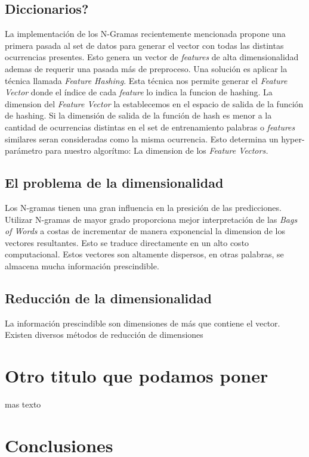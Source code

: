 \documentclass[a4paper,10pt]{article}
\begin{document}
	\subsection{Diccionarios?}
	La implementación de los N-Gramas recientemente mencionada propone una primera pasada al set de datos para generar el vector con todas las distintas ocurrencias presentes. Esto genera un vector de \textit{features} de alta dimensionalidad ademas de requerir una pasada más de preproceso. Una solución es aplicar la técnica llamada \textit{Feature Hashing}. Esta técnica nos permite generar el \textit{Feature Vector} donde el índice de cada \textit{feature} lo indica la funcion de hashing. La dimension del \textit{Feature Vector} la establecemos en el espacio de salida de la función de hashing. Si la dimensión de salida de la función de hash es menor a la cantidad de ocurrencias distintas en el set de entrenamiento palabras o \textit{features} similares seran consideradas como la misma ocurrencia. Esto determina un hyper-parámetro para nuestro algorítmo: La dimension de los \textit{Feature Vectors.}
	
	
	\subsection{El problema de la dimensionalidad}
	Los N-gramas tienen una gran influencia en la presición de las predicciones. Utilizar N-gramas de mayor grado proporciona mejor interpretación de las \textit{Bags of Words} a costas de incrementar de manera exponencial la dimension de los vectores resultantes. Esto se traduce directamente en un alto costo computacional. Estos vectores son altamente dispersos, en otras palabras, se almacena mucha información prescindible.
	
	\subsection{Reducción de la dimensionalidad}
	La información prescindible son dimensiones de más que contiene el vector. Existen diversos métodos de reducción de dimensiones
	
	\section{Otro titulo que podamos poner}
	
	mas texto
	
	\section{Conclusiones}
	
\end{document}
